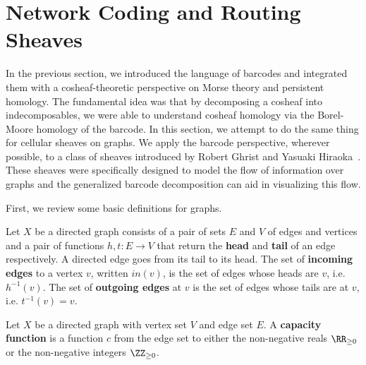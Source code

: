 
%
%

\chapter{Network Coding and Routing Sheaves}
\label{sec:nc_coding}

In the previous section, we introduced the language of barcodes and integrated them with a cosheaf-theoretic perspective on Morse theory and persistent homology. The fundamental idea was that by decomposing a cosheaf into indecomposables, we were able to understand cosheaf homology via the Borel-Moore homology of the barcode. In this section, we attempt to do the same thing for cellular sheaves on graphs. We apply the barcode perspective, wherever possible, to a class of sheaves introduced by Robert Ghrist and Yasuaki Hiraoka~\cite{GH-ncs}. These sheaves were specifically designed to model the flow of information over graphs and the generalized barcode decomposition can aid in visualizing this flow. 

First, we review some basic definitions for graphs.

\begin{defn}
	Let $X$ be a directed graph consists of a pair of sets $E$ and $V$ of edges and vertices and a pair of functions $h,t:E\to V$ that return the \textbf{head} and \textbf{tail} of an edge respectively. A directed edge goes from its tail to its head. The set of \textbf{incoming edges} to a vertex $v$, written $in(v)$, is the set of edges whose heads are $v$, i.e. $h^{-1}(v)$. The set of \textbf{outgoing edges} at $v$ is the set of edges whose tails are at $v$, i.e. $t^{-1}(v)=v$.
\end{defn}

\begin{defn}
	Let $X$ be a directed graph with vertex set $V$ and edge set $E$. A \textbf{capacity function} is a function $c$ from the edge set to either the non-negative reals $\RR_{\geq 0}$ or the non-negative integers $\ZZ_{\geq 0}$.
\end{defn}


